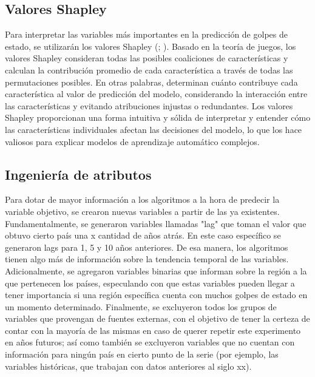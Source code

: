 \documentclass{article}
\begin{document}
\subsection{Valores Shapley}
Para interpretar las variables más importantes en la predicción de golpes de estado, se 
utilizarán los valores Shapley (\cite{Str10}; \cite{Lun17}). Basado en la teoría de 
juegos, los valores Shapley consideran todas las posibles coaliciones de características 
y calculan la contribución promedio de cada característica a través de todas las 
permutaciones posibles. En otras palabras, determinan cuánto contribuye cada 
característica al valor de predicción del modelo, considerando la interacción entre las 
características y evitando atribuciones injustas o redundantes. Los valores Shapley
proporcionan una forma intuitiva y sólida de interpretar y entender cómo las 
características individuales afectan las decisiones del modelo, lo que los hace valiosos 
para explicar modelos de aprendizaje automático complejos.

\subsection{Ingeniería de atributos}
Para dotar de mayor información a los algoritmos a la hora de predecir la variable
objetivo, se crearon nuevas variables a partir de las ya existentes. Fundamentalmente,
se generaron variables llamadas "lag" que toman el valor que obtuvo cierto país una x
cantidad de años atrás. En este caso específico se generaron lags para 1, 5 y 10 años 
anteriores. De esa manera, los algoritmos tienen algo más de información sobre la 
tendencia temporal de las variables. Adicionalmente, se agregaron variables binarias
que informan sobre la región a la que pertenecen los países, especulando con que estas
variables pueden llegar a tener importancia si una región específica cuenta con muchos
golpes de estado en un momento determinado. Finalmente, se excluyeron todos los grupos
de variables que provengan de fuentes externas, con el objetivo de tener la certeza de
contar con la mayoría de las mismas en caso de querer repetir este experimento en años 
futuros; así como también se excluyeron variables que no cuentan con información para 
ningún país en cierto punto de la serie (por ejemplo, las variables históricas, que 
trabajan con datos anteriores al siglo xx).
\end{document}
